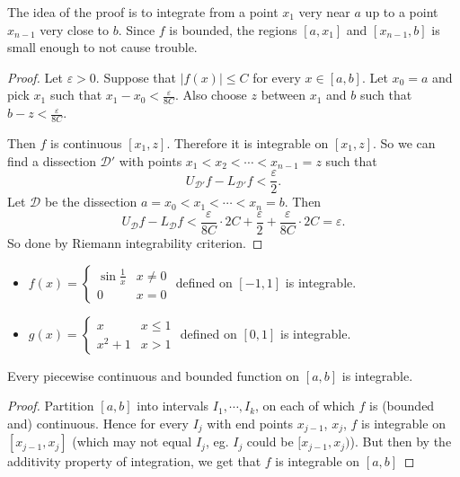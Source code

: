 \documentclass[a4paper]{article}
\begin{document}
The idea of the proof is to integrate from a point $x_1$ very near $a$ up to a point $x_{n - 1}$ very close to $b$. Since $f$ is bounded, the regions $[a, x_1]$ and $[x_{n - 1}, b]$ is small enough to not cause trouble.

\begin{proof}
  Let $\varepsilon > 0$. Suppose that $|f(x)| \leq C$ for every $x\in [a, b]$. Let $x_0 = a$ and pick $x_1$ such that $x_1 - x_0 < \frac{\varepsilon}{8C}$. Also choose $z$ between $x_1$ and $b$ such that $b - z < \frac{\varepsilon}{8C}$.

  Then $f$ is continuous $[x_1, z]$. Therefore it is integrable on $[x_1, z]$. So we can find a dissection $\mathcal{D}'$ with points $x_1 < x_2 < \cdots < x_{n - 1} = z$ such that
  \[
    U_{\mathcal{D}'}f - L_{\mathcal{D}'}f < \frac{\varepsilon}{2}.
  \]
  Let $\mathcal{D}$ be the dissection $a = x_0 < x_1 < \cdots < x_n = b$. Then
  \[
    U_\mathcal{D} f - L_\mathcal{D} f < \frac{\varepsilon}{8C}\cdot 2C + \frac{\varepsilon}{2} + \frac{\varepsilon}{8C}\cdot 2C = \varepsilon.
  \]
  So done by Riemann integrability criterion.
\end{proof}

\begin{eg}\leavevmode
  \begin{itemize}
    \item $f(x) =
      \begin{cases}
        \sin \frac{1}{x}& x \not = 0\\
        0 & x = 0
      \end{cases}$ defined on $[-1, 1]$ is integrable.
    \item $g(x) =
      \begin{cases}
        x & x \leq 1\\
        x^2 + 1 & x > 1
      \end{cases}$ defined on $[0, 1]$ is integrable.
  \end{itemize}
\end{eg}

\begin{cor}
  Every piecewise continuous and bounded function on $[a, b]$ is integrable.
\end{cor}

\begin{proof}
  Partition $[a, b]$ into intervals $I_1, \cdots, I_k$, on each of which $f$ is (bounded and) continuous. Hence for every $I_j$ with end points $x_{j - 1}$, $x_j$, $f$ is integrable on $[x_{j - 1}, x_j]$ (which may not equal $I_j$, eg. $I_j$ could be $[x_{j - 1}, x_j)$). But then by the additivity property of integration, we get that $f$ is integrable on $[a, b]$
\end{proof}
\end{document}
